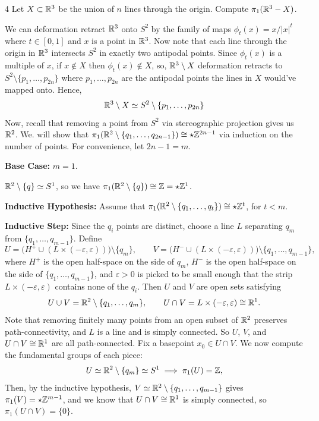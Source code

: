 \documentclass[12pt]{article}
\begin{document}
\newpage 

\begin{problem}{4}
    Let $X \subset \mathbb R^3$ be the union of $n$ lines through the origin. Compute $\pi_1(\mathbb R^3 - X)$. 
\end{problem}

\begin{solution}
    \bbni
    
    We can deformation retract $\mathbb R^3$ onto $S^2$ by the family of maps $\phi_t(x) = x/|x|^t$ where $t \in [0,1]$ and $x$ is a point in $\mathbb R^3$. Now note that each line through the origin in $\mathbb R^3$ intersects $S^2$ in exactly two antipodal points. Since $\phi_t(x)$ is a multiple of $x$, if $x \notin X$ then $\phi_t(x) \notin X$, so, $\mathbb R^3 \setminus X$ deformation retracts to $S^2 \setminus \{p_1, \ldots, p_{2n}\}$ where $p_1, \ldots, p_{2n}$ are the antipodal points the lines in $X$ would've mapped onto. Hence, 
    \[\mathbb R^3 \setminus X \simeq S^2 \setminus \{p_1, \ldots, p_{2n}\}\]
    Now, recall that removing a point from $S^2$ via stereographic projection gives us $\mathbb R^2$. We. will show that $\pi_1(\mathbb R^2 \setminus \{q_1, \ldots, q_{2n-1}\}) \cong \star \mathbb Z^{2n-1}$ via induction on the number of points. For convenience, let $2n-1 = m$. 

    \textbf{Base Case:} $m =1$. 

    $\mathbb R^2 \setminus \{q\} \simeq S^1$, so we have $\pi_1(\mathbb R^2 \setminus \{q\}) \cong \mathbb Z = \star \mathbb Z^1$.
    
    \textbf{Inductive Hypothesis:} Assume that $\pi_1(\mathbb R^2 \setminus \{q_1, \ldots, q_{t}\}) \cong \star \mathbb Z^t$, for $t < m$. 

    \textbf{Inductive Step:} Since the $q_i$ points are distinct, choose a line $L$ separating $q_m$ from $\{q_1, \ldots, q_{m-1}\}$. Define
    \[
        U = \bigl(H^+ \cup (L \times (-\varepsilon, \varepsilon))\bigr) \setminus \{q_m\},
        \qquad
        V = \bigl(H^- \cup (L \times (-\varepsilon, \varepsilon))\bigr) \setminus \{q_1, \ldots,q_{m-1}\},
    \]
    where $H^+$ is the open half-space on the side of $q_m$, $H^-$ is the open half-space on the side of $\{q_1, \ldots, q_{m-1}\}$, and $\varepsilon > 0$ is picked to be small enough that the strip $L \times (-\varepsilon, \varepsilon)$ contains none of the $q_i$. Then $U$ and $V$ are open sets satisfying
    \[
        U \cup V = \mathbb R^2 \setminus \{q_1, \ldots, q_{m}\},
        \qquad
        U \cap V = L \times (-\varepsilon, \varepsilon) \cong \mathbb R^{1}.
    \]
    Note that removing finitely many points from an open subset of $\mathbb R^2$ preserves path-connectivity, and $L$ is a line and is simply connected. So $U$, $V$, and $U \cap V \cong \mathbb R^1$ are all path-connected. Fix a basepoint $x_0 \in U \cap V$. We now compute the fundamental groups of each piece:
    \[
        U \simeq \mathbb R^2 \setminus \{q_m\} \simeq S^1
        \implies \pi_1(U) = \mathbb Z,
    \]
    Then, by the inductive hypothesis, $V \simeq \mathbb R^2 \setminus \{q_1, \ldots, q_{m-1}\}$ gives $\pi_1(V) = \star \mathbb Z^{m-1}$, and we know that $U \cap V \cong \mathbb R^{1}$ is simply connected, so $\pi_1(U \cap V) = \{0\}$.


\end{solution}
\end{document}
